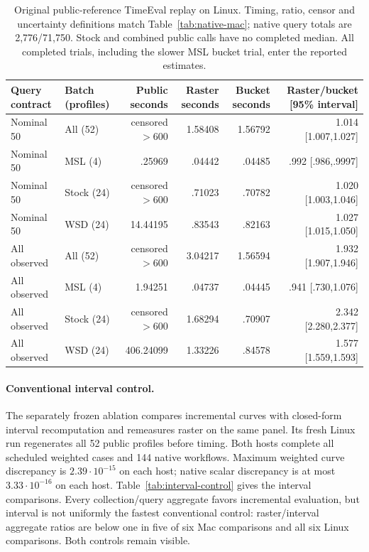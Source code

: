 \begin{table}[t]\centering\small
\begin{tabular}{llrrrr}\toprule
Query contract & Batch (profiles) & Public seconds & Raster seconds & Bucket seconds & Raster/bucket [95\% interval]\\\midrule
Nominal 50 & All (52) & censored $>600$ & 1.58408 & 1.56792 & 1.014 [1.007,1.027]\\
Nominal 50 & MSL (4) & .25969 & .04442 & .04485 & .992 [.986,.9997]\\
Nominal 50 & Stock (24) & censored $>600$ & .71023 & .70782 & 1.020 [1.003,1.046]\\
Nominal 50 & WSD (24) & 14.44195 & .83543 & .82163 & 1.027 [1.015,1.050]\\
All observed & All (52) & censored $>600$ & 3.04217 & 1.56594 & 1.932 [1.907,1.946]\\
All observed & MSL (4) & 1.94251 & .04737 & .04445 & .941 [.730,1.076]\\
All observed & Stock (24) & censored $>600$ & 1.68294 & .70907 & 2.342 [2.280,2.377]\\
All observed & WSD (24) & 406.24099 & 1.33226 & .84578 & 1.577 [1.559,1.593]\\
\bottomrule\end{tabular}
\caption{Original public-reference TimeEval replay on Linux. Timing, ratio,
censor and uncertainty definitions match Table~\ref{tab:native-mac}; native
query totals are 2,776/71,750. Stock and combined public calls have no completed
median. All completed trials, including the slower MSL bucket trial, enter
the reported estimates.}\label{tab:native-linux}\end{table}

\paragraph{Conventional interval control.}
The separately frozen ablation compares incremental curves with closed-form
interval recomputation and remeasures raster on the same panel. Its fresh Linux
run regenerates all 52 public profiles before timing. Both hosts complete all
scheduled weighted cases and 144 native workflows. Maximum weighted curve
discrepancy is $2.39\cdot10^{-15}$ on each host; native scalar discrepancy is at most
$3.33\cdot10^{-16}$ on each host. Table~\ref{tab:interval-control} gives the
interval comparisons. Every collection/query aggregate favors incremental
evaluation, but interval is not uniformly the fastest conventional control:
raster/interval aggregate ratios are below one in five of six Mac comparisons
and all six Linux comparisons. Both controls remain visible.


